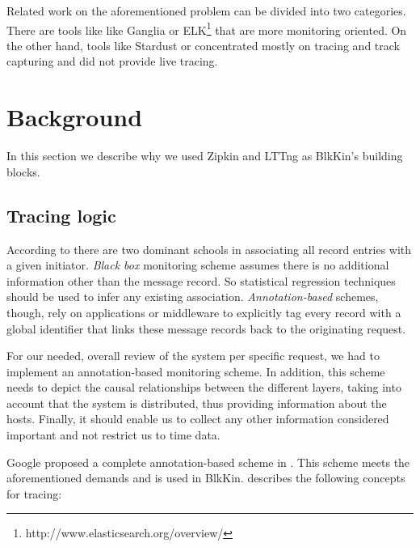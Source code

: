 \documentclass[a4paper,10pt,twocolumn]{article}
\begin{document}
Related work on the aforementioned problem can be divided into two categories.
There are tools like like Ganglia\cite{ganglia} or
ELK\footnote{http://www.elasticsearch.org/overview/} that are more monitoring
oriented. On the other hand, tools like Stardust\cite{stardust} or \cite{hp}
concentrated mostly on tracing and track capturing and did not provide live
tracing.
 
\section{Background}
In this section we describe why we used Zipkin and LTTng as BlkKin's building
blocks.

\subsection{Tracing logic}
According to \cite{dapper} there are two dominant schools in associating all
record entries with a given initiator. \emph{Black box} monitoring scheme
assumes there is no additional information other than the message record. So
statistical regression techniques should be used to infer any existing
association. \emph{Annotation-based} schemes, though, rely on applications or
middleware to explicitly tag every record with a global identifier that links
these message records back to the originating request. 

For our needed, overall review of the system per specific request, we had to
implement an annotation-based monitoring scheme. In addition, this scheme needs
to depict the causal relationships between the different layers, taking into
account that the system is distributed, thus providing information about the
hosts. Finally, it should enable us to collect any other information considered
important and not restrict us to time data.

Google proposed a complete annotation-based scheme in \cite{dapper}.
This scheme meets the aforementioned demands and is used in
BlkKin. \cite{dapper} describes the following concepts for tracing:
\end{document}
